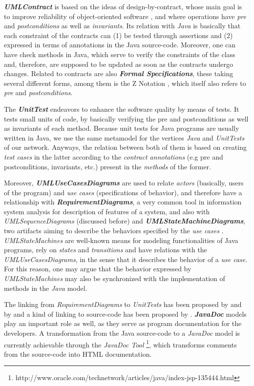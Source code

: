 \documentclass[tuberlin,cic,tc,english,noabntcite, oneside]{iiufrgs}
\begin{document}
\textbf{\emph{UMLContract}} is based on the ideas of design-by-contract, whose main goal is to improve reliability of object-oriented software \citep{meyer1992applying}, and where operations have \emph{pre} and \emph{postconditions} as well as \emph{invariants}. Its relation with \emph{Java} is basically that each constraint of the contracts can (1) be tested through assertions and (2) expressed in terms of annotations in the Java source-code. Moreover, one can have check methods in Java, which serve to verify the constraints of the class and, therefore, are supposed to be updated as soon as the contracts undergo changes. Related to contracts are also \textbf{\emph{Formal Specifications}}, these taking several different forms, among them is the Z Notation \citep{spivey1992z}, which itself also refers to \emph{pre} and \emph{postconditions}.

The \textbf{\emph{UnitTest}} endeavors to enhance the software quality by means of tests. It tests small units of code, by basically verifying the pre and postconditions as well as invariants of each method. Because unit tests for Java programs are usually written in Java, we use the same metamodel for the vertices \emph{Java} and \emph{UnitTests} of our network. Anyways, the relation between both of them is based on creating \emph{test cases} in the latter according to the \emph{contract annotations} (e.g pre and postconditions, invariants, etc.) present in the \emph{methods} of the former.

Moreover, \textbf{\emph{UMLUseCasesDiagrams}} are used to relate \emph{actors} (basically, users of the program) and \emph{use cases} (specifications of behavior), and therefore have a relationship with \textbf{\emph{RequirementDiagrams}}, a very common tool in information system analysis for description of features of a system, and also with \emph{UMLSequenceDiagrams} (discussed before) and \textbf{\emph{UMLStateMachineDiagrams}}, two artifacts aiming to describe the behaviors specified by the \emph{use cases} \citep[p. 637]{omg2007unified}. \emph{UMLStateMachines} are well-known means for modeling functionalities of Java programs, rely on \emph{states} and \emph{transitions} and have relations with the \emph{UMLUseCasesDiagrams}, in the sense that it describes the behavior of a \emph{use case}. For this reason, one may argue that the behavior expressed by \emph{UMLStateMachines} may also be synchronized with the implementation of methods in the \emph{Java} model.

The linking from \emph{RequirementDiagrams} to \emph{UnitTests} has been proposed by \citet{noack2013automatic} and by \citet{post2009linking} and a kind of linking to source-code has been proposed by \citet{antoniol2002recovering}. \textbf{\emph{JavaDoc}} models play an important role as well, as they serve as program documentation for the developers. A transformation from the Java source-code to a \emph{JavaDoc} model is currently achievable through the \emph{JavaDoc Tool} \footnote{http://www.oracle.com/technetwork/articles/java/index-jsp-135444.html}, which transforms comments from the source-code into HTML documentation.
\end{document}
